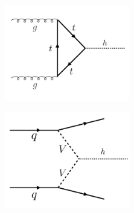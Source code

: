 \begin{figure}[h!]
  \centering
  \captionsetup{justification=centering}

   \begin{subfigure}[t]{0.5\textwidth}
        \centering
        \includegraphics[width=0.6\textwidth]{figures/ggF_Higgs}
        \caption{}
    \end{subfigure}%
    \begin{subfigure}[t]{0.5\textwidth}
        \centering
        \includegraphics[width=0.6\textwidth]{figures/VBF_Higgs}
        \caption{}
    \end{subfigure}


\end{figure}

